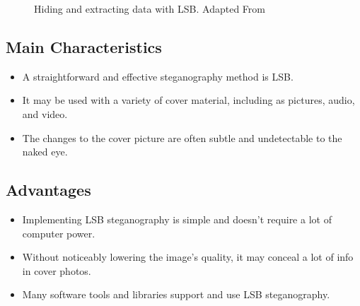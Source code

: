 \begin{figure}[ht!]
\centering
{}
\caption{Hiding and extracting data with LSB. Adapted From \cite{Hidings}}
\end{figure}

\subsection{Main Characteristics}
\begin{itemize}
\item A straightforward and effective steganography method is LSB.
\item It may be used with a variety of cover material, including as pictures, audio, and video.
\item The changes to the cover picture are often subtle and undetectable to the naked eye.
\end{itemize}

\subsection{Advantages}
\begin{itemize}
\item Implementing LSB steganography is simple and doesn't require a lot of computer power.
\item Without noticeably lowering the image's quality, it may conceal a lot of info in cover photos.
\item Many software tools and libraries support and use LSB steganography.
\end{itemize}

